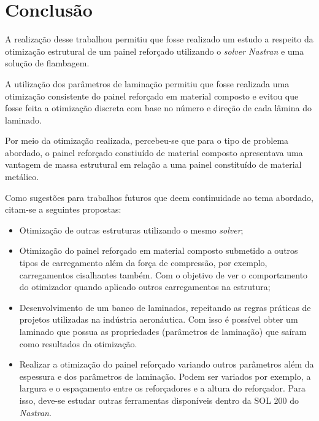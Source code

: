 \chapter[Conclusão]{Conclusão}

A realização desse trabalhou permitiu que fosse realizado um estudo a respeito da otimização estrutural de um painel reforçado utilizando o \emph{solver Nastran} e uma solução de flambagem.

A utilização dos parâmetros de laminação permitiu que fosse realizada uma otimização consistente do painel reforçado em material composto e evitou que fosse feita a otimização discreta com base no número e direção de cada lâmina do laminado.

Por meio da otimização realizada, percebeu-se que para o tipo de problema abordado, o painel reforçado constiuído de material composto apresentava uma vantagem de massa estrutural em relação a uma painel constituído de material metálico.

Como sugestões para trabalhos futuros que deem continuidade ao tema abordado, citam-se a seguintes propostas:

\begin{itemize}
\item Otimização de outras estruturas utilizando o mesmo \emph{solver};
\item Otimização do painel reforçado em material composto submetido a outros tipos de carregamento além da força de compressão, por exemplo, carregamentos cisalhantes também. Com o objetivo de ver o comportamento do otimizador quando aplicado outros carregamentos na estrutura;
\item Desenvolvimento de um banco de laminados, repeitando as regras práticas de projetos utilizadas na indústria aeronáutica. Com isso é possível obter um laminado que possua as propriedades (parâmetros de laminação) que saíram como resultados da otimização.
\item Realizar a otimização do painel reforçado variando outros parâmetros além da espessura e dos parâmetros de laminação. Podem ser variados por exemplo, a largura e o espaçamento entre os reforçadores e a altura do reforçador. Para isso, deve-se estudar outras ferramentas disponíveis dentro da SOL 200 do \emph{Nastran}.
\end{itemize}
